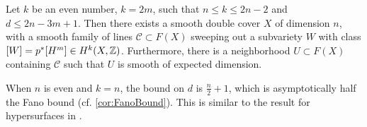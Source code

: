 \begin{proposition}
  \label{prop:SmoothExampleLinearSpace}
  Let $k$ be an even number, $k = 2m$, such that $n \leq k \leq 2n-2$ and $d \leq 2n-3m+1$. Then there exists a smooth double cover $X$ of dimension $n$, with a smooth family of lines $\mathcal{C} \subset F(X)$ sweeping out a subvariety $W$ with class $[W] = p^*[H^m] \in H^k(X,\mathbb{Z})$. Furthermore, there is a neighborhood $U \subset F(X)$ containing $\mathcal{C}$ such that $U$ is smooth of expected dimension. 
\end{proposition}
\begin{remark}
  When $n$ is even and $k=n$, the bound on $d$ is $\frac{n}{2} + 1$, which is asymptotically half the Fano bound (cf. \cref{cor:FanoBound}). This is similar to the result for hypersurfaces in \cite[Theorem 2-ii]{ShimadaHypersurfaces}.
\end{remark}
